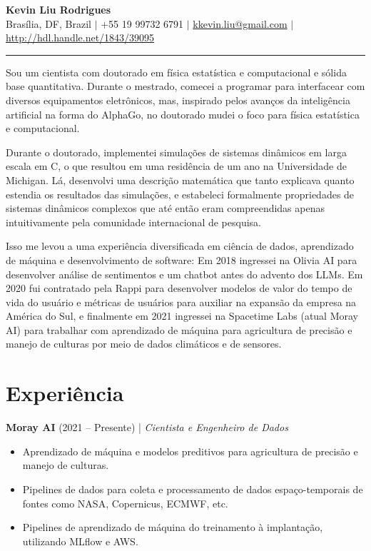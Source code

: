 \documentclass[10pt,a4paper]{article}
\begin{document}
\begin{center}
    {\LARGE \textbf{Kevin Liu Rodrigues}}  \\
    \vspace{2pt}
    Brasília, DF, Brazil $|$ +55 19 99732 6791  $|$ \href{mailto:kkevin.liu@gmail.com}{kkevin.liu@gmail.com} $|$
	\href{http://hdl.handle.net/1843/39095}{http://hdl.handle.net/1843/39095}
\end{center}

\noindent\rule{\textwidth}{0.4pt}
Sou um cientista com doutorado em física estatística e computacional e sólida base quantitativa. Durante o mestrado,
comecei a programar para interfacear com diversos equipamentos eletrônicos, mas, inspirado pelos avanços da inteligência
artificial na forma do AlphaGo, no doutorado mudei o foco para física estatística e computacional.

Durante o doutorado, implementei simulações de sistemas dinâmicos em larga escala em C, o que resultou em uma residência
de um ano na Universidade de Michigan. Lá, desenvolvi uma descrição matemática que tanto explicava quanto estendia os
resultados das simulações, e estabeleci formalmente propriedades de sistemas dinâmicos complexos que até então eram
compreendidas apenas intuitivamente pela comunidade internacional de pesquisa.

Isso me levou a uma experiência diversificada em ciência de dados, aprendizado de máquina e desenvolvimento de software:
Em 2018 ingressei na Olivia AI para desenvolver análise de sentimentos e um chatbot antes do advento dos LLMs. Em 2020
fui contratado pela Rappi para desenvolver modelos de valor do tempo de vida do usuário e métricas de usuários para
auxiliar na expansão da empresa na América do Sul, e finalmente em 2021 ingressei na Spacetime Labs (atual Moray AI)
para trabalhar com aprendizado de máquina para agricultura de precisão e manejo de culturas por meio de dados climáticos
e de sensores.

\section{Experiência}

\textbf{Moray AI} (2021 -- Presente) | \textit{Cientista e Engenheiro de Dados} 
\begin{itemize}[noitemsep, topsep=0pt]
    \item Aprendizado de máquina e modelos preditivos para agricultura de precisão e manejo de culturas.
    \item Pipelines de dados para coleta e processamento de dados espaço-temporais de fontes como NASA, Copernicus, ECMWF, etc.
    \item Pipelines de aprendizado de máquina do treinamento à implantação, utilizando MLflow e AWS.
\end{itemize}
\end{document}

